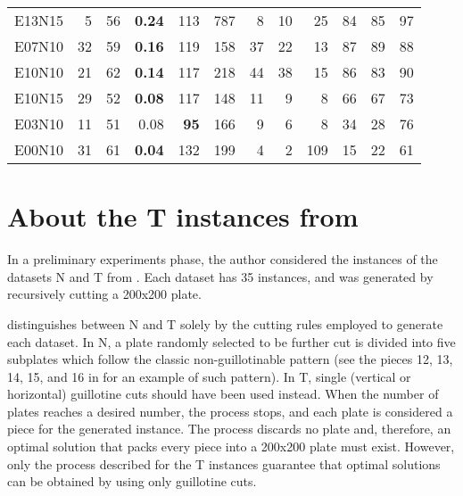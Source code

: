 \documentclass[ppgc,tese,english,formais,babel]{iiufrgs}
\newcommand{\bestcolumnemph}[1]{\textbf{#1}}
\def\citethopperthesis{\citet{hopper_thesis}}
\begin{document}
\begin{table}
\begin{center}
\begin{tabular}{lrrrrrrrrrrr}
E13N15 & 5 & 56 & \bestcolumnemph{0.24} & 113 & 787 & 8 & 10 & 25 & 84 & 85 & 97 \\
E07N10 & 32 & 59 & \bestcolumnemph{0.16} & 119 & 158 & 37 & 22 & 13 & 87 & 89 & 88 \\
E10N10 & 21 & 62 & \bestcolumnemph{0.14} & 117 & 218 & 44 & 38 & 15 & 86 & 83 & 90 \\
E10N15 & 29 & 52 & \bestcolumnemph{0.08} & 117 & 148 & 11 & 9 & 8 & 66 & 67 & 73 \\
E03N10 & 11 & 51 & 0.08 & \bestcolumnemph{95} & 166 & 9 & 6 & 8 & 34 & 28 & 76 \\
E00N10 & 31 & 61 & \bestcolumnemph{0.04} & 132 & 199 & 4 & 2 & 109 & 15 & 22 & 61 \\\hline\hline
\end{tabular}
\end{center}
\end{table}


\chapter{About the T instances from \protect\citethopperthesis}
\label{sec:about_T_instances}

In a preliminary experiments phase, the author considered the instances of the datasets N and T from \citet{hopper_thesis}. %
Each dataset has 35 instances, and was generated by recursively cutting a 200x200 plate. %


\citet{hopper_thesis} distinguishes between N and T solely by the cutting rules employed to generate each dataset.
In N, a plate randomly selected to be further cut is divided into five subplates which follow the classic non-guillotinable pattern (see the pieces 12, 13, 14, 15, and 16 in  for an example of such pattern).
In T, single (vertical or horizontal) guillotine cuts should have been used instead.
When the number of plates reaches a desired number, the process stops, and each plate is considered a piece for the generated instance.
The process discards no plate and, therefore, an optimal solution that packs every piece into a 200x200 plate must exist.
However, only the process described for the T instances guarantee that optimal solutions can be obtained by using only guillotine cuts.
\end{document}
